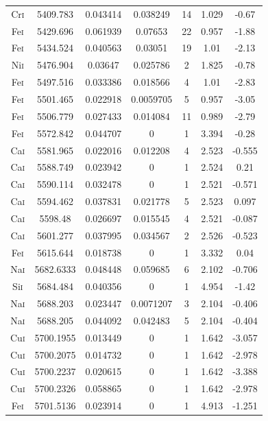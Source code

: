 \begin{longtable}{|c|c|c|c|c|c|c|}
Cr\textsc{i} & 5409.783 & 0.043414 & 0.038249 & 14 & 1.029 & -0.67 \\ 
Fe\textsc{i} & 5429.696 & 0.061939 & 0.07653 & 22 & 0.957 & -1.88 \\  
Fe\textsc{i} & 5434.524 & 0.040563 & 0.03051 & 19 & 1.01 & -2.13 \\   
Ni\textsc{i} & 5476.904 & 0.03647 & 0.025786 & 2 & 1.825 & -0.78 \\   
Fe\textsc{i} & 5497.516 & 0.033386 & 0.018566 & 4 & 1.01 & -2.83 \\   
Fe\textsc{i} & 5501.465 & 0.022918 & 0.0059705 & 5 & 0.957 & -3.05 \\ 
Fe\textsc{i} & 5506.779 & 0.027433 & 0.014084 & 11 & 0.989 & -2.79 \\ 
Fe\textsc{i} & 5572.842 & 0.044707 & 0 & 1 & 3.394 & -0.28 \\         
Ca\textsc{i} & 5581.965 & 0.022016 & 0.012208 & 4 & 2.523 & -0.555 \\ 
Ca\textsc{i} & 5588.749 & 0.023942 & 0 & 1 & 2.524 & 0.21 \\          
Ca\textsc{i} & 5590.114 & 0.032478 & 0 & 1 & 2.521 & -0.571 \\        
Ca\textsc{i} & 5594.462 & 0.037831 & 0.021778 & 5 & 2.523 & 0.097 \\  
Ca\textsc{i} & 5598.48 & 0.026697 & 0.015545 & 4 & 2.521 & -0.087 \\  
Ca\textsc{i} & 5601.277 & 0.037995 & 0.034567 & 2 & 2.526 & -0.523 \\ 
Fe\textsc{i} & 5615.644 & 0.018738 & 0 & 1 & 3.332 & 0.04 \\          
Na\textsc{i} & 5682.6333 & 0.048448 & 0.059685 & 6 & 2.102 & -0.706 \\
Si\textsc{i} & 5684.484 & 0.040356 & 0 & 1 & 4.954 & -1.42 \\         
Na\textsc{i} & 5688.203 & 0.023447 & 0.0071207 & 3 & 2.104 & -0.406 \\
Na\textsc{i} & 5688.205 & 0.044092 & 0.042483 & 5 & 2.104 & -0.404 \\ 
Cu\textsc{i} & 5700.1955 & 0.013449 & 0 & 1 & 1.642 & -3.057 \\       
Cu\textsc{i} & 5700.2075 & 0.014732 & 0 & 1 & 1.642 & -2.978 \\       
Cu\textsc{i} & 5700.2237 & 0.020615 & 0 & 1 & 1.642 & -3.388 \\       
Cu\textsc{i} & 5700.2326 & 0.058865 & 0 & 1 & 1.642 & -2.978 \\       
Fe\textsc{i} & 5701.5136 & 0.023914 & 0 & 1 & 4.913 & -1.251 \\       

\end{longtable}
